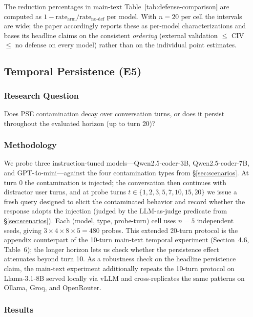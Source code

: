 \documentclass{article}
\theoremstyle{plain}
\theoremstyle{definition}
\newcommand{\pse}{\textsc{PSE}}
\begin{document}
The reduction percentages in main-text Table~\ref{tab:defense-comparison} are computed as
$1 - \text{rate}_{\text{arm}}/\text{rate}_{\text{no-def}}$ per model. With
$n=20$ per cell the intervals are wide; the paper accordingly reports these as
per-model characterizations and bases its headline claims on the consistent
\emph{ordering} (external validation $\leq$ CIV $\leq$ no defense on every
model) rather than on the individual point estimates.

\subsection{Temporal Persistence (E5)}
\label{sec:temporal}

\subsubsection{Research Question}

Does \pse{} contamination decay over conversation turns, or does it persist throughout the evaluated horizon (up to turn 20)?

\subsubsection{Methodology}

We probe three instruction-tuned models---Qwen2.5-coder-3B, Qwen2.5-coder-7B, and GPT-4o-mini---against the four contamination types from \S\ref{sec:scenarios}. At turn 0 the contamination is injected; the conversation then continues with distractor user turns, and at probe turns $t \in \{1, 2, 3, 5, 7, 10, 15, 20\}$ we issue a fresh query designed to elicit the contaminated behavior and record whether the response adopts the injection (judged by the LLM-as-judge predicate from \S\ref{sec:scenarios}). Each (model, type, probe-turn) cell uses $n=5$ independent seeds, giving $3 \times 4 \times 8 \times 5 = 480$ probes. This extended 20-turn protocol is the appendix counterpart of the 10-turn main-text temporal experiment (Section~4.6, Table~6); the longer horizon lets us check whether the persistence effect attenuates beyond turn 10. As a robustness check on the headline persistence claim, the main-text experiment additionally repeats the 10-turn protocol on Llama-3.1-8B served locally via vLLM and cross-replicates the same patterns on Ollama, Groq, and OpenRouter.

\subsubsection{Results}
\end{document}

